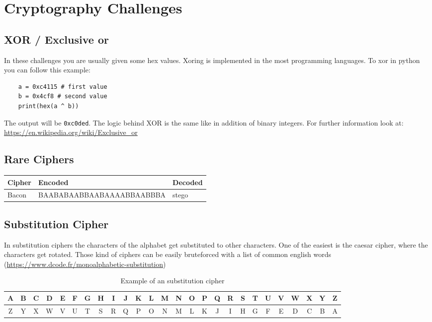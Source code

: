 
\section{Cryptography Challenges}

\subsection{XOR / Exclusive or} In these challenges you are usually given some hex values. Xoring is implemented in the most programming languages. To xor in python you can follow this example:

\begin{lstlisting}
	a = 0xc4115 # first value
	b = 0x4cf8 # second value
	print(hex(a ^ b))
\end{lstlisting}

The output will be \texttt{0xc0ded}. The logic behind XOR is the same like in addition of binary integers. For further information look at: \url{https://en.wikipedia.org/wiki/Exclusive_or}

\subsection{Rare Ciphers}


\begin{table}[htb]
	\centering
	\begin{tabular}[\textwidth]{C{3cm}|C{4cm}|C{3cm}}
		\toprule
		\textbf{Cipher} & \textbf{Encoded} & \textbf{Decoded} \\
		\midrule[1.25pt]
		Bacon & BAABABAABBAABAAAABBAABBBA & stego \\
		\bottomrule
	\end{tabular} 
\end{table}

\subsection{Substitution Cipher}
In substitution ciphers the characters of the alphabet get substituted to other characters. One of the easiest is the caesar cipher, where the characters get rotated. Those kind of ciphers can be easily bruteforced with a list of common english words (\url{https://www.dcode.fr/monoalphabetic-substitution})

\begin{table}
	\begin{tabular}{|c|c|c|c|c|c|c|c|c|c|c|c|c|c|c|c|c|c|c|c|c|c|c|c|c|c|}
	\toprule
	A & B & C & D & E & F & G & H & I & J & K & L & M & N & O & P & Q & R & S & T & U & V & W & X & Y & Z \\
	\midrule
	Z & Y & X & W & V & U & T & S & R & Q & P & O & N & M & L & K & J & I & H & G & F & E & D & C & B & A \\
	\bottomrule
	\end{tabular}
	\caption{Example of an substitution cipher}
\end{table}

